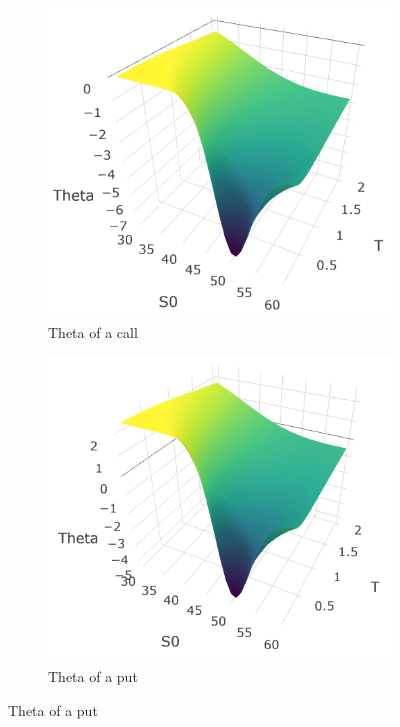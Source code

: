 \documentclass[hidelinks]{article}
\begin{document}
    \begin{figure}
	\centering
	\caption{Theta surfaces}
  \begin{subfigure}[b]{0.45\textwidth}
    \includegraphics[width=\textwidth]{theta_call.png}
    \caption{Theta of a call}
    \label{fig:theta_call}
  \end{subfigure}
  \begin{subfigure}[b]{0.45\textwidth}
    \includegraphics[width=\textwidth]{theta_put.png}
    \caption{Theta of a put}
    \label{fig:theta_put}
  \end{subfigure}
\end{figure}
\end{document}
